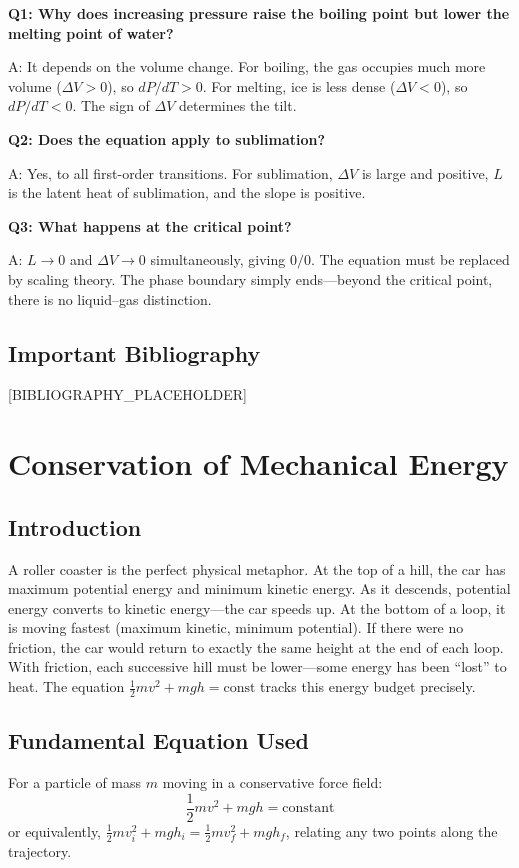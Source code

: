\documentclass[11pt,openright]{book}
\begin{document}
\textbf{Q1: Why does increasing pressure raise the boiling point but lower the melting point of water?}

A: It depends on the volume change. For boiling, the gas occupies much more volume ($\Delta V > 0$), so $dP/dT > 0$. For melting, ice is less dense ($\Delta V < 0$), so $dP/dT < 0$. The sign of $\Delta V$ determines the tilt.

\textbf{Q2: Does the equation apply to sublimation?}

A: Yes, to all first-order transitions. For sublimation, $\Delta V$ is large and positive, $L$ is the latent heat of sublimation, and the slope is positive.

\textbf{Q3: What happens at the critical point?}

A: $L \to 0$ and $\Delta V \to 0$ simultaneously, giving $0/0$. The equation must be replaced by scaling theory. The phase boundary simply ends---beyond the critical point, there is no liquid--gas distinction.
\section*{Important Bibliography}

[BIBLIOGRAPHY_PLACEHOLDER]


\chapter{Conservation of Mechanical Energy}

\section*{Introduction}

A roller coaster is the perfect physical metaphor. At the top of a hill, the car has maximum potential energy and minimum kinetic energy. As it descends, potential energy converts to kinetic energy---the car speeds up. At the bottom of a loop, it is moving fastest (maximum kinetic, minimum potential). If there were no friction, the car would return to exactly the same height at the end of each loop. With friction, each successive hill must be lower---some energy has been ``lost'' to heat. The equation $\frac{1}{2}mv^2 + mgh = \text{const}$ tracks this energy budget precisely.
\section*{Fundamental Equation Used}

For a particle of mass $m$ moving in a conservative force field:
\[
\frac{1}{2}mv^2 + mgh = \text{constant}
\]
or equivalently, $\frac{1}{2}mv_i^2 + mgh_i = \frac{1}{2}mv_f^2 + mgh_f$, relating any two points along the trajectory.
\end{document}
